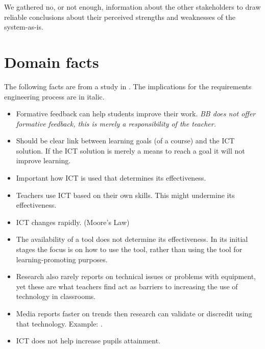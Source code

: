 We gathered no, or not enough, information about the other stakeholders to draw reliable conclusions about their perceived strengths and weaknesses of the system-as-is.

\section{Domain facts}
The following facts are from a study in \cite{ict_study}. The implications for the requirements engineering process are in italic.
\begin{itemize}

	\item Formative feedback can help students improve their work. \textit{BB does not offer formative feedback, this is merely a responsibility of the teacher.}
	\item Should be clear link between learning goals (of a course) and the ICT solution. If the ICT solution is merely a means to reach a goal it will not improve learning. 
	\item Important how ICT is used that determines its effectiveness. 
	\item Teachers use ICT based on their own skills. This might undermine its effectiveness. 
	\item ICT changes rapidly. (Moore's Law)
	\item The availability of a tool does not determine its effectiveness. In its initial stages the focus is on how to use the tool, rather than using the tool for learning-promoting purposes.
	\item Research also rarely reports on technical issues or problems with equipment, yet these are what teachers find act as barriers to increasing the use of technology in classrooms. 
	\item Media reports faster on trends then research can validate or discredit using that technology. Example: . 
	\item ICT does not help increase pupils attainment.
\end{itemize}



